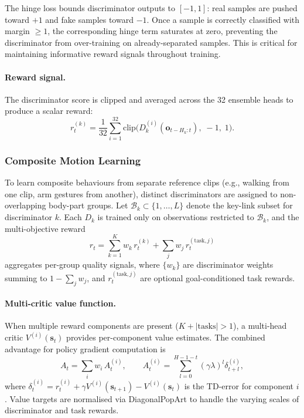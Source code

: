 The hinge loss bounds discriminator outputs to $[-1, 1]$: real samples are pushed toward $+1$ and fake samples toward $-1$. Once a sample is correctly classified with margin $\geq 1$, the corresponding hinge term saturates at zero, preventing the discriminator from over-training on already-separated samples. This is critical for maintaining informative reward signals throughout training.

\paragraph{Reward signal.}
The discriminator score is clipped and averaged across the 32 ensemble heads to produce a scalar reward:
\[
    r_t^{(k)} = \frac{1}{32}\sum_{i=1}^{32} \mathrm{clip}\bigl(D_k^{(i)}(\mathbf{o}_{t-H_k:t}),\; -1,\; 1\bigr).
\]


\subsubsection{Composite Motion Learning}
\label{sec:composite}

To learn composite behaviours from separate reference clips (e.g., walking from one clip, arm gestures from another), distinct discriminators are assigned to non-overlapping body-part groups. Let $\mathcal{B}_k \subset \{1, \ldots, L\}$ denote the key-link subset for discriminator $k$. Each $D_k$ is trained only on observations restricted to $\mathcal{B}_k$, and the multi-objective reward
\[
    r_t = \sum_{k=1}^{K} w_k\, r_t^{(k)} + \sum_{j} w_j\, r_t^{(\mathrm{task},j)}
\]
aggregates per-group quality signals, where $\{w_k\}$ are discriminator weights summing to $1 - \sum_j w_j$, and $r_t^{(\mathrm{task},j)}$ are optional goal-conditioned task rewards.

\paragraph{Multi-critic value function.}
When multiple reward components are present ($K + |\text{tasks}| > 1$), a multi-head critic $V^{(i)}(\mathbf{s}_t)$ provides per-component value estimates. The combined advantage for policy gradient computation is
\[
    A_t = \sum_{i} w_i\, A_t^{(i)}, \qquad A_t^{(i)} = \sum_{l=0}^{H-1-t}(\gamma\lambda)^l \delta_{t+l}^{(i)},
\]
where $\delta_t^{(i)} = r_t^{(i)} + \gamma V^{(i)}(\mathbf{s}_{t+1}) - V^{(i)}(\mathbf{s}_t)$ is the TD-error for component $i$. Value targets are normalised via DiagonalPopArt to handle the varying scales of discriminator and task rewards.

